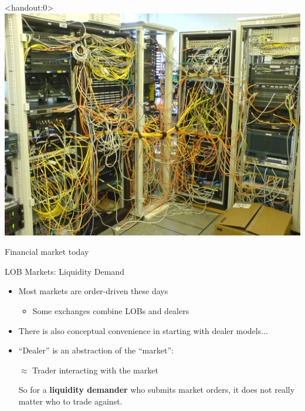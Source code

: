 \documentclass[english,10pt
,aspectratio=169
]{beamer}
\begin{document}
\begin{frame}<handout:0>
	\centering
	\includegraphics[scale=0.19]{pics/mkt21}
	
	Financial market today
\end{frame}


\begin{frame}{LOB Markets: Liquidity Demand}
	\begin{itemize}
		\item Most markets are order-driven these days
		\begin{itemize}
			\item Some exchanges combine LOBs and dealers
		\end{itemize}
		\item There is also conceptual convenience in starting with dealer models...
		\item ``Dealer'' is an abstraction of the ``market'':
		\begin{center}
			 $\approx$ \alert{Trader interacting with the market}
		\end{center}
		So for a \textbf{liquidity demander} who submits market orders, it does not really matter who to trade against.
	\end{itemize}
\end{frame}
\end{document}
